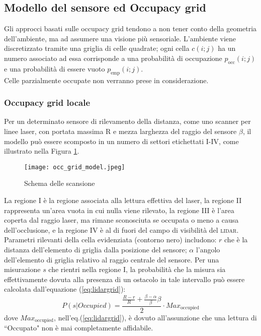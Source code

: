 \subsection{Modello del sensore ed Occupacy grid}
\label{sec:occupacygrid}
Gli approcci basati sulle occupacy grid tendono a non tener conto della
geometria dell'ambiente, ma ad assumere una visione più sensoriale.
L'ambiente viene discretizzato tramite una griglia di celle quadrate; ogni
cella $c(i; j)$ ha un numero associato ad essa corrisponde a una probabilità
di occupazione $p_{\text{occ}}(i; j)$ e una probabilità di essere
vuoto $p_{\text{emp}}(i;j)$.\\
Celle parzialmente occupate non verranno prese in considerazione.

\subsubsection{Occupacy grid locale}
\label{ssec:localoccgrid}
Per un determinato sensore di rilevamento della distanza, come uno scanner per
linee laser, con portata massima R e mezza larghezza del raggio del sensore
$\beta$, il modello può essere scomposto in un numero di settori etichettati
I-IV\cite{ardhaoui2011implementation}, come illustrato nella Figura \ref{fig:scan scheme}.
%
\begin{figure}[htb]
  \texttt{[image: occ\_grid\_model.jpeg]}
  \caption{Schema delle scansione}
  \label{fig:scan scheme}
\end{figure}

\noindent La regione I è la regione associata alla lettura effettiva del laser,
la regione II rappresenta un'area vuota in cui nulla viene rilevato, la
regione III è l'area coperta dal raggio laser, ma rimane sconosciuta se occupata
o meno a causa dell'occlusione, e la regione IV è al di fuori del campo di
visibilità del \textsc{lidar}.
Parametri rilevanti della cella evidenziata (contorno nero) includono: $r$ che
è la distanza dell'elemento di griglia dalla posizione del sensore;
$\alpha$ l'angolo dell'elemento di griglia relativo al raggio centrale del
sensore.
Per una misurazione $s$ che rientri nella regione I, la probabilità che la
misura sia effettivamente dovuta alla presenza di  un ostacolo in tale
intervallo può essere calcolata dall'equazione (\ref{eq:lidargrid}):
%
\begin{equation}
\label{eq:lidargrid}
P(s|Occupied) = \frac{\frac{R-r}{R} + \frac{ \beta- \alpha}{\beta} \beta}{2}
\cdot Max_{\text{occupied}}
\end{equation}
%
dove $Max_{\text{occupied}}$, nell'eq.(\ref{eq:lidargrid}), è dovuto
all'assunzione che una lettura di ``Occupato" non è mai completamente
affidabile.
%
